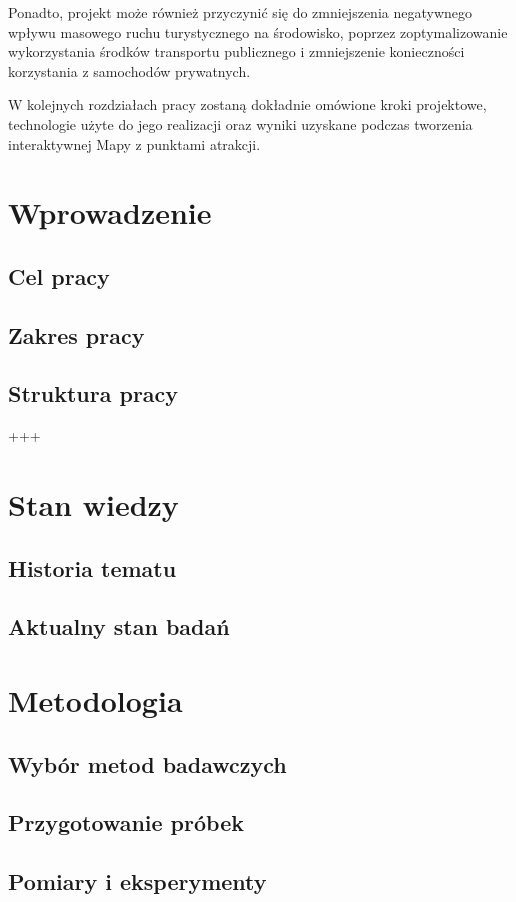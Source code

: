 \documentclass{report}
\begin{document}
	Ponadto, projekt może również przyczynić się do zmniejszenia negatywnego wpływu masowego ruchu turystycznego na środowisko, poprzez zoptymalizowanie wykorzystania środków transportu publicznego i zmniejszenie konieczności korzystania z samochodów prywatnych.
	
	W kolejnych rozdziałach pracy zostaną dokładnie omówione kroki projektowe, technologie użyte do jego realizacji oraz wyniki uzyskane podczas tworzenia interaktywnej Mapy z punktami atrakcji.
	
	\chapter{Wprowadzenie}
	\section{Cel pracy}
	\section{Zakres pracy}
	\section{Struktura pracy}
	+++
	\chapter{Stan wiedzy}
	\section{Historia tematu}
	\section{Aktualny stan badań}
	
	\chapter{Metodologia}
	\section{Wybór metod badawczych}
	\section{Przygotowanie próbek}
	\section{Pomiary i eksperymenty}
	
\end{document}
